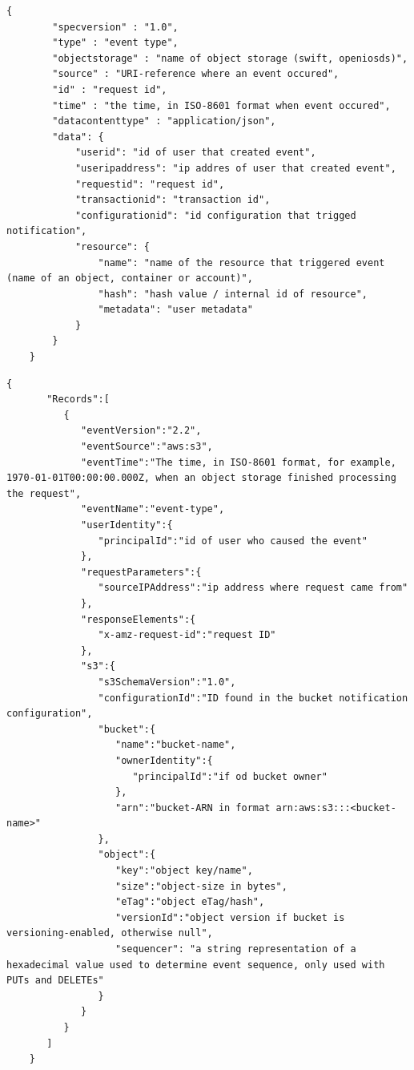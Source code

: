     \begin{lstlisting}[style=jsonStyle, caption=CloudEvents structure of event notification published by ENOSS middleware., label=lst:eventStructureCE]
    {
        "specversion" : "1.0",
        "type" : "event type",
        "objectstorage" : "name of object storage (swift, openiosds)",
        "source" : "URI-reference where an event occured",
        "id" : "request id",
        "time" : "the time, in ISO-8601 format when event occured",
        "datacontenttype" : "application/json",
        "data": {
            "userid": "id of user that created event",
            "useripaddress": "ip addres of user that created event",
            "requestid": "request id",
            "transactionid": "transaction id",
            "configurationid": "id configuration that trigged notification",
            "resource": {
                "name": "name of the resource that triggered event (name of an object, container or account)",
                "hash": "hash value / internal id of resource",
                "metadata": "user metadata"
            }
        }
    }
    \end{lstlisting}

    \begin{minipage}{\linewidth}
    \begin{lstlisting}[style=jsonStyle, caption=Amazon S3 structure of event notification published by ENOSS middleware., label=lst:eventStructureS3]
    {
       "Records":[
          {
             "eventVersion":"2.2",
             "eventSource":"aws:s3",
             "eventTime":"The time, in ISO-8601 format, for example, 1970-01-01T00:00:00.000Z, when an object storage finished processing the request",
             "eventName":"event-type",
             "userIdentity":{
                "principalId":"id of user who caused the event"
             },
             "requestParameters":{
                "sourceIPAddress":"ip address where request came from"
             },
             "responseElements":{
                "x-amz-request-id":"request ID"
             },
             "s3":{
                "s3SchemaVersion":"1.0",
                "configurationId":"ID found in the bucket notification configuration",
                "bucket":{
                   "name":"bucket-name",
                   "ownerIdentity":{
                      "principalId":"if od bucket owner"
                   },
                   "arn":"bucket-ARN in format arn:aws:s3:::<bucket-name>"
                },
                "object":{
                   "key":"object key/name",
                   "size":"object-size in bytes",
                   "eTag":"object eTag/hash",
                   "versionId":"object version if bucket is versioning-enabled, otherwise null",
                   "sequencer": "a string representation of a hexadecimal value used to determine event sequence, only used with PUTs and DELETEs"
                }
             }
          }
       ]
    }
    \end{lstlisting}
    \end{minipage}

